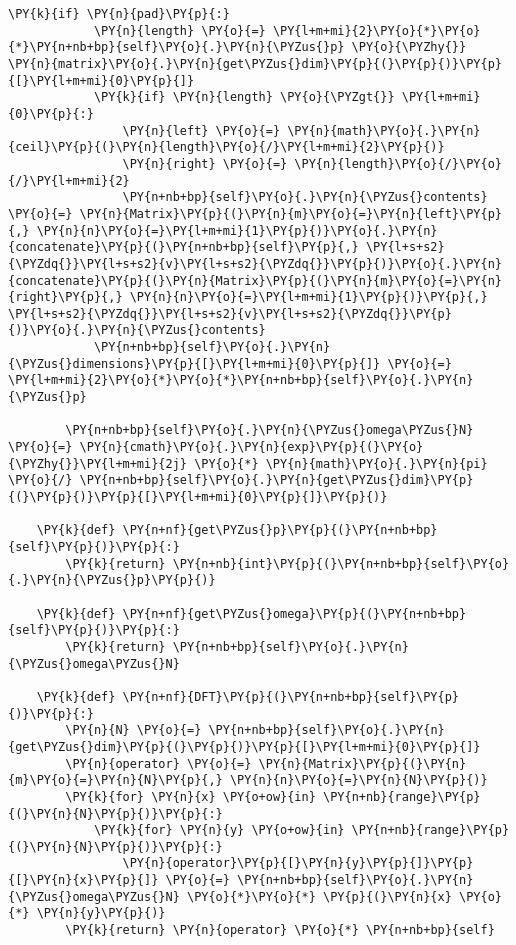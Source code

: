 \begin{Verbatim}[commandchars=\\\{\}]
        \PY{k}{if} \PY{n}{pad}\PY{p}{:}
            \PY{n}{length} \PY{o}{=} \PY{l+m+mi}{2}\PY{o}{*}\PY{o}{*}\PY{n+nb+bp}{self}\PY{o}{.}\PY{n}{\PYZus{}p} \PY{o}{\PYZhy{}} \PY{n}{matrix}\PY{o}{.}\PY{n}{get\PYZus{}dim}\PY{p}{(}\PY{p}{)}\PY{p}{[}\PY{l+m+mi}{0}\PY{p}{]}
            \PY{k}{if} \PY{n}{length} \PY{o}{\PYZgt{}} \PY{l+m+mi}{0}\PY{p}{:}
                \PY{n}{left} \PY{o}{=} \PY{n}{math}\PY{o}{.}\PY{n}{ceil}\PY{p}{(}\PY{n}{length}\PY{o}{/}\PY{l+m+mi}{2}\PY{p}{)}
                \PY{n}{right} \PY{o}{=} \PY{n}{length}\PY{o}{/}\PY{o}{/}\PY{l+m+mi}{2}
                \PY{n+nb+bp}{self}\PY{o}{.}\PY{n}{\PYZus{}contents} \PY{o}{=} \PY{n}{Matrix}\PY{p}{(}\PY{n}{m}\PY{o}{=}\PY{n}{left}\PY{p}{,} \PY{n}{n}\PY{o}{=}\PY{l+m+mi}{1}\PY{p}{)}\PY{o}{.}\PY{n}{concatenate}\PY{p}{(}\PY{n+nb+bp}{self}\PY{p}{,} \PY{l+s+s2}{\PYZdq{}}\PY{l+s+s2}{v}\PY{l+s+s2}{\PYZdq{}}\PY{p}{)}\PY{o}{.}\PY{n}{concatenate}\PY{p}{(}\PY{n}{Matrix}\PY{p}{(}\PY{n}{m}\PY{o}{=}\PY{n}{right}\PY{p}{,} \PY{n}{n}\PY{o}{=}\PY{l+m+mi}{1}\PY{p}{)}\PY{p}{,} \PY{l+s+s2}{\PYZdq{}}\PY{l+s+s2}{v}\PY{l+s+s2}{\PYZdq{}}\PY{p}{)}\PY{o}{.}\PY{n}{\PYZus{}contents}
            \PY{n+nb+bp}{self}\PY{o}{.}\PY{n}{\PYZus{}dimensions}\PY{p}{[}\PY{l+m+mi}{0}\PY{p}{]} \PY{o}{=} \PY{l+m+mi}{2}\PY{o}{*}\PY{o}{*}\PY{n+nb+bp}{self}\PY{o}{.}\PY{n}{\PYZus{}p}
        
        \PY{n+nb+bp}{self}\PY{o}{.}\PY{n}{\PYZus{}omega\PYZus{}N} \PY{o}{=} \PY{n}{cmath}\PY{o}{.}\PY{n}{exp}\PY{p}{(}\PY{o}{\PYZhy{}}\PY{l+m+mi}{2j} \PY{o}{*} \PY{n}{math}\PY{o}{.}\PY{n}{pi} \PY{o}{/} \PY{n+nb+bp}{self}\PY{o}{.}\PY{n}{get\PYZus{}dim}\PY{p}{(}\PY{p}{)}\PY{p}{[}\PY{l+m+mi}{0}\PY{p}{]}\PY{p}{)}
        
    \PY{k}{def} \PY{n+nf}{get\PYZus{}p}\PY{p}{(}\PY{n+nb+bp}{self}\PY{p}{)}\PY{p}{:}
        \PY{k}{return} \PY{n+nb}{int}\PY{p}{(}\PY{n+nb+bp}{self}\PY{o}{.}\PY{n}{\PYZus{}p}\PY{p}{)}
        
    \PY{k}{def} \PY{n+nf}{get\PYZus{}omega}\PY{p}{(}\PY{n+nb+bp}{self}\PY{p}{)}\PY{p}{:}
        \PY{k}{return} \PY{n+nb+bp}{self}\PY{o}{.}\PY{n}{\PYZus{}omega\PYZus{}N}

    \PY{k}{def} \PY{n+nf}{DFT}\PY{p}{(}\PY{n+nb+bp}{self}\PY{p}{)}\PY{p}{:}
        \PY{n}{N} \PY{o}{=} \PY{n+nb+bp}{self}\PY{o}{.}\PY{n}{get\PYZus{}dim}\PY{p}{(}\PY{p}{)}\PY{p}{[}\PY{l+m+mi}{0}\PY{p}{]}
        \PY{n}{operator} \PY{o}{=} \PY{n}{Matrix}\PY{p}{(}\PY{n}{m}\PY{o}{=}\PY{n}{N}\PY{p}{,} \PY{n}{n}\PY{o}{=}\PY{n}{N}\PY{p}{)}
        \PY{k}{for} \PY{n}{x} \PY{o+ow}{in} \PY{n+nb}{range}\PY{p}{(}\PY{n}{N}\PY{p}{)}\PY{p}{:}
            \PY{k}{for} \PY{n}{y} \PY{o+ow}{in} \PY{n+nb}{range}\PY{p}{(}\PY{n}{N}\PY{p}{)}\PY{p}{:}
                \PY{n}{operator}\PY{p}{[}\PY{n}{y}\PY{p}{]}\PY{p}{[}\PY{n}{x}\PY{p}{]} \PY{o}{=} \PY{n+nb+bp}{self}\PY{o}{.}\PY{n}{\PYZus{}omega\PYZus{}N} \PY{o}{*}\PY{o}{*} \PY{p}{(}\PY{n}{x} \PY{o}{*} \PY{n}{y}\PY{p}{)}
        \PY{k}{return} \PY{n}{operator} \PY{o}{*} \PY{n+nb+bp}{self}
    

\end{Verbatim}
